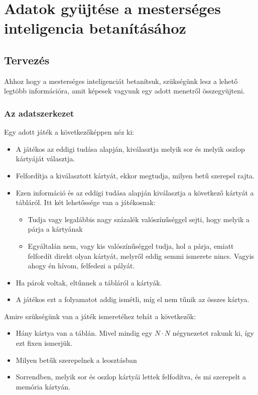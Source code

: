 \chapter{Adatok gyüjtése a mesterséges inteligencia betanításához}
\thispagestyle{fancy}
\pagestyle{fancy}


\section{Tervezés}
Ahhoz hogy a mesterséges inteligenciát betanítsuk, szükségünk lesz a lehető legtöbb információra, amit képesek vagyunk egy adott menetről összegyüjteni.
\subsection{Az adatszerkezet}
Egy adott játék a következőképpen néz ki:
\begin{itemize}
\item A játékos az eddigi tudása alapján, kiválasztja melyik sor és melyik oszlop kártyáját választja.
\item Felfordítja a kiválasztott kártyát, ekkor megtudja, milyen betű szerepel rajta. 
\item Ezen információ és az eddigi tudása alapján kiválasztja a következő kártyát a tábláról. Itt két lehetőssége van a játékosnak: 
\begin{itemize}
    \item Tudja vagy legalábbis nagy százalék valószínűséggel sejti, hogy melyik a párja a kártyának 
    \item Egyáltalán nem, vagy kis valószínűséggel tudja, hol a párja, emiatt felfordít direkt olyan kártyát, melyről eddig semmi ismerete nincs. Vagyis ahogy én hívom, felfedezi a pályát.
\end{itemize}
\item Ha párok voltak, eltűnnek a tábláról a kártyák.
\item A játékos ezt a folyamatot addig ismétli, míg el nem tűnik az összes kártya.
\end{itemize}

Amire szükségünk van a játék ismeretéhez tehát a következők: 
\begin{itemize}
    \item Hány kártya van a táblán. Mivel mindig egy $N \cdot N$ négynezetet rakunk ki, így ezt fixen ismerjük. 
    \item Milyen betűk szerepelnek a leosztásban
    \item Sorrendben, melyik sor és oszlop kártyái lettek felfodítva, és mi szerepelt a memória kártyán. 
\end{itemize}

